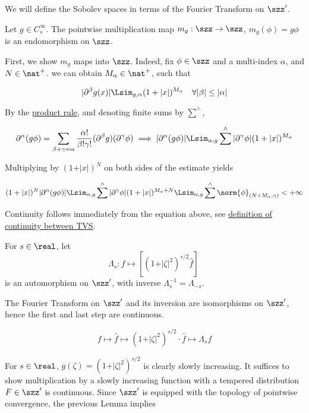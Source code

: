 We will define the Sobolev spaces in terms of the Fourier Transform on
\(\szz'\).

Let \(g\in C_s^\infty\). The pointwise multiplication map
\(m_g: \szz\to\szz\), \(m_g(\phi) = g\phi\) is an endomorphism on
\(\szz\).

First, we show \(m_g\) maps into \(\szz\). Indeed, fix \(\phi\in\szz\)
and a multi-index \(\alpha\), and \(N\in\nat^+\). we can obtain
\(M_\alpha\in\nat^+\), such that

\[
\vert \partial^\beta g(x)\vert\Lsim_{g,\alpha} (1+\vert x\vert)^{M_\alpha}\quad\forall\vert\beta\vert\leq\vert\alpha\vert
\]

By the
\href{\%7B\%7B\%20site.baseurl\%20\%7D\%7D/\%7B\%\%20post_url\%202023-08-12-folland-distribution-excerpts\%20\%\%7D\#chapter-8---multivariate-calculus}{product
rule}, and denoting finite sums by \(\sum^\wedge\),

\[
\partial^\alpha (g\phi) = \sum_{\beta+\gamma = \alpha}\dfrac{\alpha!}{\beta!\gamma!}(\partial^\beta g)(\partial^\gamma \phi)\implies\vert\partial^\alpha(g\phi)\vert\Lsim_{\alpha,g}\sum^{\wedge}\vert\partial^\gamma\phi\vert(1+\vert x\vert)^{M_{\alpha}}
\]

Multiplying by \((1+\vert x\vert)^{N}\) on both sides of the estimate
yields

\[
(1+\vert x\vert)^N\vert\partial^\alpha(g\phi)\vert\Lsim_{\alpha,g}\sum^{\wedge}\vert\partial^\gamma\phi\vert(1+\vert x\vert)^{M_\alpha + N}\Lsim_{\alpha,g}\sum^{\wedge}\norm{\phi}_{(N+M_\alpha,\gamma)}<+\infty
\]

Continuity follows immediately from the equation above, see
\href{\%7B\%7B\%20site.baseurl\%20\%7D\%7D/\%7B\%\%20post_url\%202023-08-12-folland-distribution-excerpts\%20\%\%7D\#chapter-5---frechet-space-convergence}{definition
of continuity between TVS}.

For \(s\in\real\), let
\[\Lambda_s: f\mapsto [(1+\vert\zeta\vert^2)^{s/2}\hat{f}]^{\breve{\:}}\]
is an automorphism on \(\szz'\), with inverse
\(\Lambda_s^{-1} = \Lambda_{-s}\).

The Fourier Transform on \(\szz'\) and its inversion are isomorphisms on
\(\szz'\), hence the first and last step are continuous.

\[
f\mapsto \hat{f}\mapsto (1+\vert\zeta\vert^2)^{s/2}\cdot \hat{f} \mapsto \Lambda_s f
\]

For \(s\in\real\), \(g(\zeta) = (1+\vert\zeta\vert^2)^{s/2}\) is clearly
slowly increasing. It suffices to show multiplication by a slowly
increasing function with a tempered distribution \(F\in \szz'\) is
continuous. Since \(\szz'\) is equipped with the topology of pointwise
convergence, the previous Lemma implies

